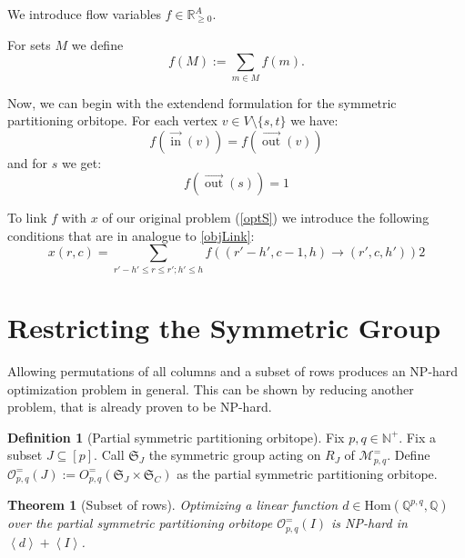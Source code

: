 \documentclass[a4paper]{amsart}
\newtheorem{theorem}{Theorem}
\theoremstyle{definition}
\newtheorem{defn}{Definition}
\DeclareMathOperator{\In}{in}
\DeclareMathOperator{\Out}{out}
\newcommand{\ina}{\ensuremath{\vec{\In}}}
\newcommand{\outa}{\ensuremath{\vec{\Out}}}
\newcommand{\lr}[1]{\ensuremath{\left( #1 \right)}}
\newcommand{\lrE}[1]{\ensuremath{\left[ #1 \right]}}
\newcommand{\lrX}[1]{\ensuremath{\left< #1 \right>}}
\newcommand{\naturals}{\ensuremath{\mathbb{N}}}
\newcommand{\rationals}{\ensuremath{\mathbb{Q}}}
\newcommand{\Hom}{\ensuremath{\mathrm{Hom}}}
\newcommand{\M}{\ensuremath{\mathcal{M}}}
\newcommand{\Sym}{\ensuremath{\mathfrak{S}}}
\begin{document}
We introduce flow variables \(f \in \mathbb{R}^A_{\geq 0}\).  

For sets \(M\) we define
\[f (M) := \sum_{m\in M} f(m)\text{.}\]

Now, we can begin with the extendend formulation for the 
symmetric partitioning orbitope.  For each vertex \(v \in V \setminus
\{s, t\}\) we have:
\begin{equation}
f\left(\ina(v)\right) = f\left(\outa(v)\right)
\end{equation}
and for \(s\) we get:
\begin{equation}
f\left(\outa(s)\right) = 1
\end{equation}



To link \(f\) with \(x\) of our original problem (\ref{optS}) we
introduce the following conditions that are in analogue to \ref{objLink}:
\begin{equation}
  x \left( r, c \right) =
  \sum_{r' - h' \leq r \leq r'; h' \leq h} f\left(\left(r'-h', c-1, h\right)
    \rightarrow \left(r', c, h'\right) \right)
2\end{equation}

\section{Restricting the Symmetric Group}

Allowing permutations of all columns and a subset of rows produces an
NP-hard optimization problem in general.  This can be shown by
reducing another problem, that is already proven to be NP-hard.

\begin{defn}[Partial symmetric partitioning orbitope]
  Fix \(p, q \in \naturals^+\).  Fix a subset \(J \subseteq \lrE{p}\).
  Call \(\Sym_{J}\) the symmetric group acting on \(R_J\) of \(\M^=_{p, q}\).
  Define \(\mathcal{O}^=_{p,q}\lr{J} := O^=_{p, q} \lr{\Sym_{J} \times \Sym_{C}} \) as the partial symmetric partitioning orbitope.
\end{defn}

\begin{theorem}[Subset of rows]
  \label{subset-rows}
  Optimizing a linear function \(d \in \Hom\lr{\rationals^{p,q},\rationals}\) over the partial symmetric partitioning orbitope
  \(\mathcal{O}^=_{p, q}\lr{I}\) is NP-hard in \(\lrX{d}+\lrX{I}\).
\end{theorem}
\end{document}
